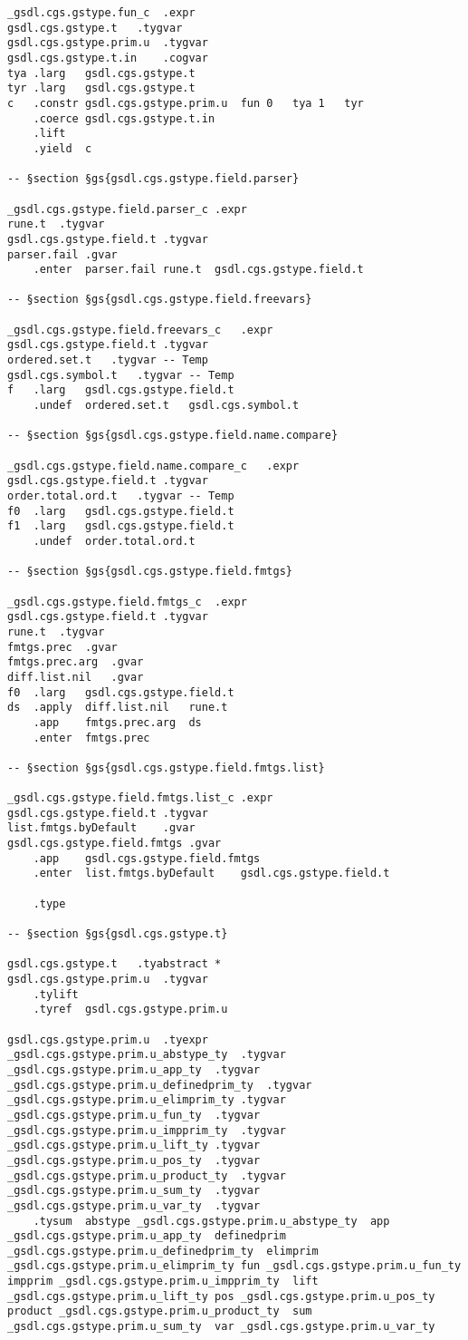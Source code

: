 \documentclass{report}
\begin{document}
\begin{verbatim}
_gsdl.cgs.gstype.fun_c	.expr
gsdl.cgs.gstype.t	.tygvar
gsdl.cgs.gstype.prim.u	.tygvar
gsdl.cgs.gstype.t.in	.cogvar
tya	.larg	gsdl.cgs.gstype.t
tyr	.larg	gsdl.cgs.gstype.t
c	.constr	gsdl.cgs.gstype.prim.u	fun	0	tya	1	tyr
	.coerce	gsdl.cgs.gstype.t.in
	.lift
	.yield	c

-- §section §gs{gsdl.cgs.gstype.field.parser}

_gsdl.cgs.gstype.field.parser_c	.expr
rune.t	.tygvar
gsdl.cgs.gstype.field.t	.tygvar
parser.fail	.gvar
	.enter	parser.fail	rune.t	gsdl.cgs.gstype.field.t

-- §section §gs{gsdl.cgs.gstype.field.freevars}

_gsdl.cgs.gstype.field.freevars_c	.expr
gsdl.cgs.gstype.field.t	.tygvar
ordered.set.t	.tygvar	-- Temp
gsdl.cgs.symbol.t	.tygvar	-- Temp
f	.larg	gsdl.cgs.gstype.field.t
	.undef	ordered.set.t	gsdl.cgs.symbol.t

-- §section §gs{gsdl.cgs.gstype.field.name.compare}

_gsdl.cgs.gstype.field.name.compare_c	.expr
gsdl.cgs.gstype.field.t	.tygvar
order.total.ord.t	.tygvar	-- Temp
f0	.larg	gsdl.cgs.gstype.field.t
f1	.larg	gsdl.cgs.gstype.field.t
	.undef	order.total.ord.t

-- §section §gs{gsdl.cgs.gstype.field.fmtgs}

_gsdl.cgs.gstype.field.fmtgs_c	.expr
gsdl.cgs.gstype.field.t	.tygvar
rune.t	.tygvar
fmtgs.prec	.gvar
fmtgs.prec.arg	.gvar
diff.list.nil	.gvar
f0	.larg	gsdl.cgs.gstype.field.t
ds	.apply	diff.list.nil	rune.t
	.app	fmtgs.prec.arg	ds
	.enter	fmtgs.prec

-- §section §gs{gsdl.cgs.gstype.field.fmtgs.list}

_gsdl.cgs.gstype.field.fmtgs.list_c	.expr
gsdl.cgs.gstype.field.t	.tygvar
list.fmtgs.byDefault	.gvar
gsdl.cgs.gstype.field.fmtgs	.gvar
	.app	gsdl.cgs.gstype.field.fmtgs
	.enter	list.fmtgs.byDefault	gsdl.cgs.gstype.field.t

	.type

-- §section §gs{gsdl.cgs.gstype.t}

gsdl.cgs.gstype.t	.tyabstract	*
gsdl.cgs.gstype.prim.u	.tygvar
	.tylift
	.tyref	gsdl.cgs.gstype.prim.u

gsdl.cgs.gstype.prim.u	.tyexpr
_gsdl.cgs.gstype.prim.u_abstype_ty	.tygvar
_gsdl.cgs.gstype.prim.u_app_ty	.tygvar
_gsdl.cgs.gstype.prim.u_definedprim_ty	.tygvar
_gsdl.cgs.gstype.prim.u_elimprim_ty	.tygvar
_gsdl.cgs.gstype.prim.u_fun_ty	.tygvar
_gsdl.cgs.gstype.prim.u_impprim_ty	.tygvar
_gsdl.cgs.gstype.prim.u_lift_ty	.tygvar
_gsdl.cgs.gstype.prim.u_pos_ty	.tygvar
_gsdl.cgs.gstype.prim.u_product_ty	.tygvar
_gsdl.cgs.gstype.prim.u_sum_ty	.tygvar
_gsdl.cgs.gstype.prim.u_var_ty	.tygvar
	.tysum	abstype	_gsdl.cgs.gstype.prim.u_abstype_ty	app	_gsdl.cgs.gstype.prim.u_app_ty	definedprim	_gsdl.cgs.gstype.prim.u_definedprim_ty	elimprim	_gsdl.cgs.gstype.prim.u_elimprim_ty	fun	_gsdl.cgs.gstype.prim.u_fun_ty	impprim	_gsdl.cgs.gstype.prim.u_impprim_ty	lift	_gsdl.cgs.gstype.prim.u_lift_ty	pos	_gsdl.cgs.gstype.prim.u_pos_ty	product	_gsdl.cgs.gstype.prim.u_product_ty	sum	_gsdl.cgs.gstype.prim.u_sum_ty	var	_gsdl.cgs.gstype.prim.u_var_ty


\end{verbatim}
\end{document}
